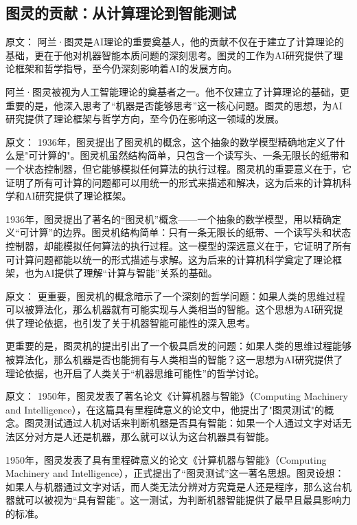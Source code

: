 \subsection{图灵的贡献：从计算理论到智能测试}

原文：
阿兰·图灵是AI理论的重要奠基人，他的贡献不仅在于建立了计算理论的基础，更在于他对机器智能本质问题的深刻思考。图灵的工作为AI研究提供了理论框架和哲学指导，至今仍深刻影响着AI的发展方向。

阿兰·图灵被视为人工智能理论的奠基者之一。他不仅建立了计算理论的基础，更重要的是，他深入思考了“机器是否能够思考”这一核心问题。图灵的思想，为AI研究提供了理论框架与哲学方向，至今仍在影响这一领域的发展。

原文：
1936年，图灵提出了图灵机的概念，这个抽象的数学模型精确地定义了什么是"可计算的"。图灵机虽然结构简单，只包含一个读写头、一条无限长的纸带和一个状态控制器，但它能够模拟任何算法的执行过程。图灵机的重要意义在于，它证明了所有可计算的问题都可以用统一的形式来描述和解决，这为后来的计算机科学和AI研究提供了理论框架。

1936年，图灵提出了著名的“图灵机”概念——一个抽象的数学模型，用以精确定义“可计算”的边界。图灵机结构简单：只有一条无限长的纸带、一个读写头和状态控制器，却能模拟任何算法的执行过程。这一模型的深远意义在于，它证明了所有可计算问题都能以统一的形式描述与求解。这为后来的计算机科学奠定了理论框架，也为AI提供了理解“计算与智能”关系的基础。

原文：
更重要，图灵机的概念暗示了一个深刻的哲学问题：如果人类的思维过程可以被算法化，那么机器就有可能实现与人类相当的智能。这个思想为AI研究提供了理论依据，也引发了关于机器智能可能性的深入思考。

更重要的是，图灵机的提出引出了一个极具启发的问题：如果人类的思维过程能够被算法化，那么机器是否也能拥有与人类相当的智能？这一思想为AI研究提供了理论依据，也开启了人类关于“机器思维可能性”的哲学讨论。

原文：
1950年，图灵发表了著名论文《计算机器与智能》（Computing Machinery and Intelligence），在这篇具有里程碑意义的论文中，他提出了"图灵测试"的概念。图灵测试通过人机对话来判断机器是否具有智能：如果一个人通过文字对话无法区分对方是人还是机器，那么就可以认为这台机器具有智能。

1950年，图灵发表了具有里程碑意义的论文《计算机器与智能》（Computing Machinery and Intelligence），正式提出了“图灵测试”这一著名思想。图灵设想：如果人与机器通过文字对话，而人类无法分辨对方究竟是人还是程序，那么这台机器就可以被视为“具有智能”。这一测试，为判断机器智能提供了最早且最具影响力的标准。

